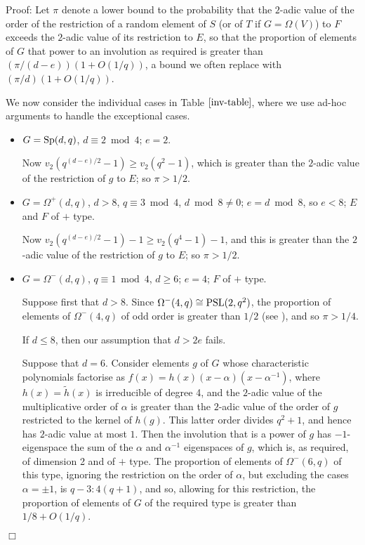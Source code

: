 \documentclass[12pt]{article}
\newenvironment{proof}{\normalsize {\sc Proof}:}{{\hfill $\Box$ \\}}
\def\Oh{O}  %
\def\PSL{{\rm PSL}}
\def\Sp{{\rm Sp}}
\begin{document}
\begin{proof}
Let $\pi$ denote a lower bound to the probability that the 
$2$-adic value of the order
of the restriction of a random element of $S$ (or of $T$ if $G=\Omega(V)$)
to $F$ exceeds the $2$-adic
value of its restriction to $E$, so that the proportion of elements of $G$ that power to an involution as required is greater than
$(\pi/(d-e))(1+\Oh(1/q))$, a bound we often replace with 
$(\pi/d)(1+\Oh(1/q))$.

We now consider the individual cases in Table $\ref{inv-table}$, 
where we use ad-hoc arguments to handle the exceptional cases. 
\begin{itemize}
\item $G=\Sp(d,q)$, $d\equiv2\bmod4$; $e=2$.

Now $v_2(q^{(d-e)/2}-1)\ge v_2(q^2-1)$, which is greater 
than the $2$-adic value of the restriction of $g$ to $E$; so $\pi>1/2$.

\item 
$G=\Omega^+(d,q)$, $d>8$, $q\equiv3\bmod4$, $d\bmod8\ne0$; 
$e=d\bmod8$, so $e<8$; $E$ and $F$ of $+$ type.

Now $v_2(q^{(d-e)/2}-1)-1 \ge v_2(q^4-1)-1$, and this is greater than 
the $2$-adic value of the restriction of $g$ to $E$; so $\pi>1/2$.

\item 
$G=\Omega^-(d,q)$, $q\equiv1\bmod4$, $d\ge6$;  $e=4$; $F$ of $+$ type.

Suppose first that $d>8$.
Since $\Omega^-(4,q)\cong\PSL(2,q^2)$, the proportion
of elements of $\Omega^-(4,q)$ of odd order 
is greater than $1/2$ (see \cite[p.\ 288]{Dornhoff}),  
and so $\pi>1/4$.

If $d\le8$, then our assumption that $d>2e$ fails. 

Suppose that $d=6$.  Consider elements $g$ of $G$ whose characteristic
polynomials factorise as $f(x)=h(x)(x-\alpha)(x-\alpha^{-1})$, where
$h(x)=\tilde{h}(x)$ is irreducible of degree 4, and the $2$-adic value
of the multiplicative order of $\alpha$ is greater than the 
$2$-adic value of the order of $g$ restricted to the kernel of $h(g)$.
This latter order divides $q^2+1$, and hence has $2$-adic value at most
$1$.  Then the involution that is a power of $g$ has $-1$-eigenspace
the sum of the $\alpha$ and $\alpha^{-1}$ eigenspaces of $g$, which is,
as required, of dimension 2 and of $+$ type.  The proportion of
elements of $\Omega^-(6,q)$ of this type, ignoring the restriction
on the order of $\alpha$, but excluding the cases $\alpha=\pm1$,
is $q-3:4(q+1)$, and so, allowing for this restriction, the
proportion of elements of $G$ of the required type is greater than
$1/8 + \Oh(1/q)$.


\end{itemize}
\end{proof}
\end{document}
